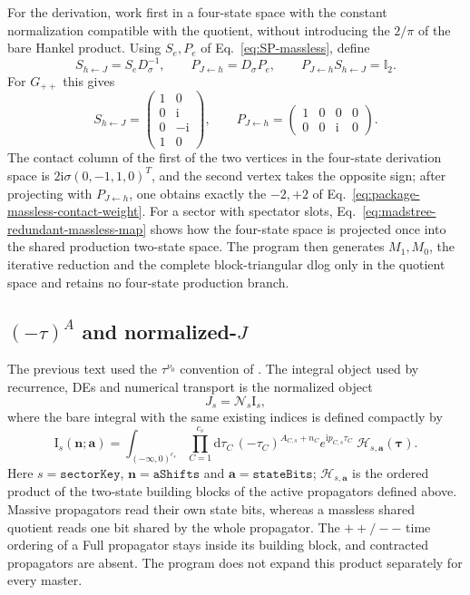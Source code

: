 \documentclass[11pt,a4paper]{article}
\newcommand{\dd}{\mathrm d}
\newcommand{\ii}{\mathrm i}
\newcommand{\Id}{\mathbb I}
\newcommand{\cN}{\mathcal N}
\begin{document}
For the derivation, work first in a four-state space with the constant normalization compatible
with the quotient, without introducing the $2/\pi$ of the bare Hankel product. Using $S_e,P_e$ of
Eq.~\eqref{eq:SP-massless}, define
\begin{equation}
 S_{h\leftarrow J}=S_eD_{\sigma}^{-1},\qquad
 P_{J\leftarrow h}=D_{\sigma}P_e,\qquad
 P_{J\leftarrow h}S_{h\leftarrow J}=\Id_2.
 \label{eq:madstree-redundant-massless-map}
\end{equation}
For $G_{++}$ this gives
\begin{equation}
 S_{h\leftarrow J}=\begin{pmatrix}1&0\\0&\ii\\0&-\ii\\1&0\end{pmatrix},
 \qquad
 P_{J\leftarrow h}=\begin{pmatrix}1&0&0&0\\0&0&\ii&0\end{pmatrix}.
\end{equation}
The contact column of the first of the two vertices in the four-state derivation space is
$2\ii\sigma(0,-1,1,0)^T$, and the second vertex takes the opposite sign; after projecting with
$P_{J\leftarrow h}$, one obtains exactly the $-2,+2$ of Eq.~\eqref{eq:package-massless-contact-weight}.
For a sector with spectator slots, Eq.~\eqref{eq:madstree-redundant-massless-map} shows how the
four-state space is projected once into the shared production two-state space. The program then
generates $M_1,M_0$, the iterative reduction and the complete block-triangular dlog only in the
quotient space and retains no four-state production branch.

\subsection{\texorpdfstring{$(-\tau)^A$ and normalized-$J$}{(-tau)A and normalized-J}}
\label{sec:normalized-J}

The previous text used the $\tau^{\nu_0}$ convention of \cite{Chen:2023eic}. The integral object used by recurrence, DEs and numerical transport is the normalized object
\begin{equation}
 J_s=\cN_s\text{I}_s,
\end{equation}
where the bare integral with the same existing indices is defined compactly by
\begin{equation}
 \text{I}_s(\bm n;\bm a)=
 \int_{(-\infty,0)^{c_s}}
 \prod_{C=1}^{c_s}\!\dd\tau_C\,
 (-\tau_C)^{A_{C,s}+n_C}e^{\ii p_{C,s}\tau_C}
 \;\mathcal H_{s,\bm a}(\bm\tau).
 \label{eq:package-bare-integral}
\end{equation}
Here $s=\texttt{sectorKey}$, $\bm n=\texttt{aShifts}$ and $\bm a=\texttt{stateBits}$;
$\mathcal H_{s,\bm a}$ is the ordered product of the two-state building blocks of the active propagators defined above.
Massive propagators read their own state bits, whereas a massless shared quotient reads one bit shared by the whole propagator. The $++/--$ time ordering of a Full propagator stays inside its building block, and contracted propagators are absent. The program does not expand this product separately for every master.
\end{document}
